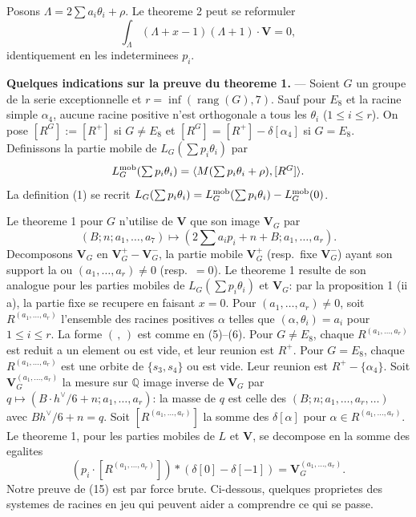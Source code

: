 \documentclass[11pt,a4paper]{article}
\theoremstyle{plain}
\theoremstyle{definition}
\DeclareMathOperator{\rank}{rang}
\newcommand{\rang}{\rank}
\begin{document}
Posons $\Lambda = 2\sum a_i \theta_i + \rho$. Le theoreme 2 peut se reformuler
\begin{equation}\label{eq:12}
\int_\Lambda (\Lambda + x - 1)(\Lambda + 1) \cdot \mathbf{V} = 0,
\end{equation}
identiquement en les indeterminees $p_i$.

\bigskip

\textbf{Quelques indications sur la preuve du theoreme 1.} --- Soient $G$ un groupe de la serie exceptionnelle et $r = \inf(\rang(G),7)$. Sauf pour $E_8$ et la racine simple $\alpha_4$, aucune racine positive n'est orthogonale a tous les $\theta_i$ ($1 \leq i \leq r$). On pose $[R^G] := [R^+]$ si $G \not= E_8$ et $[R^G] = [R^+] - \delta[\alpha_4]$ si $G = E_8$. Definissons la partie mobile de $L_G(\sum p_i \theta_i)$ par
\begin{equation}\label{eq:13}
L_G^{\textup{mob}}(\textstyle\sum p_i \theta_i) = \langle M(\sum p_i \theta_i + \rho), [R^G] \rangle.
\end{equation}
La definition (1) se recrit $L_G(\sum p_i \theta_i) = L_G^{\textup{mob}}(\sum p_i \theta_i) - L_G^{\textup{mob}}(0)$.

Le theoreme 1 pour $G$ n'utilise de $\mathbf{V}$ que son image $\mathbf{V}_G$ par
\begin{equation}\label{eq:14}
(B; n; a_1,\dots,a_7) \mapsto (2\textstyle\sum a_i p_i + n + B; a_1,\dots,a_r).
\end{equation}
Decomposons $\mathbf{V}_G$ en $\mathbf{V}_G^+ - \mathbf{V}_G^-$, la partie mobile $\mathbf{V}_G^+$ (resp.\ fixe $\mathbf{V}_G^-$) ayant son support la ou $(a_1,\dots,a_r) \not= 0$ (resp.\ $= 0$). Le theoreme 1 resulte de son analogue pour les parties mobiles de $L_G(\sum p_i \theta_i)$ et $\mathbf{V}_G$: par la proposition 1 (ii a), la partie fixe se recupere en faisant $x = 0$. Pour $(a_1,\dots,a_r) \not= 0$, soit $R^{(a_1,\dots,a_r)}$ l'ensemble des racines positives $\alpha$ telles que $(\alpha, \theta_i) = a_i$ pour $1 \leq i \leq r$. La forme $(\, , \,)$ est comme en (5)--(6). Pour $G \not= E_8$, chaque $R^{(a_1,\dots,a_r)}$ est reduit a un element ou est vide, et leur reunion est $R^+$. Pour $G = E_8$, chaque $R^{(a_1,\dots,a_r)}$ est une orbite de $\{s_3, s_4\}$ ou est vide. Leur reunion est $R^+ - \{\alpha_4\}$. Soit $\mathbf{V}_G^{(a_1,\dots,a_r)}$ la mesure sur $\mathbb{Q}$ image inverse de $\mathbf{V}_G$ par $q \mapsto (B\cdot h^\vee/6 + n; a_1,\dots,a_r)$: la masse de $q$ est celle des $(B; n; a_1,\dots,a_r,\dots)$ avec $Bh^\vee/6 + n = q$. Soit $[R^{(a_1,\dots,a_r)}]$ la somme des $\delta[\alpha]$ pour $\alpha \in R^{(a_1,\dots,a_r)}$. Le theoreme 1, pour les parties mobiles de $L$ et $\mathbf{V}$, se decompose en la somme des egalites
\begin{equation}\label{eq:15}
(p_i \cdot [R^{(a_1,\dots,a_r)}]) * (\delta[0] - \delta[-1]) = \mathbf{V}_G^{(a_1,\dots,a_r)}.
\end{equation}
Notre preuve de (15) est par force brute. Ci-dessous, quelques proprietes des systemes de racines en jeu qui peuvent aider a comprendre ce qui se passe.
\end{document}
